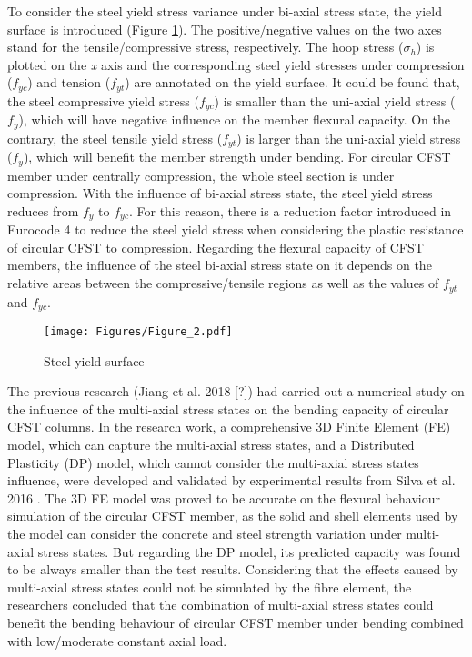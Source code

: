 \documentclass[12pt,a4]{article}
\begin{document}
	To consider the steel yield stress variance under bi-axial stress state, the yield surface is introduced (Figure \ref{fig-2}). The positive/negative values on the two axes stand for the tensile/compressive stress, respectively. The hoop stress ($\sigma_h$) is plotted on the \textit{x} axis and the corresponding steel yield stresses under compression ($f_{yc}$) and tension ($f_{yt}$) are annotated on the yield surface. It could be found that, the steel compressive yield stress ($f_{yc}$) is smaller than the uni-axial yield stress ($f_y$), which will have negative influence on the member flexural capacity. On the contrary, the steel tensile yield stress ($f_{yt}$) is larger than the uni-axial yield stress ($f_y$), which will benefit the member strength under bending. For circular CFST member under centrally compression, the whole steel section is under compression. With the influence of bi-axial stress state, the steel yield stress reduces from $f_y$ to $f_{yc}$. For this reason, there is a reduction factor introduced in Eurocode 4 \cite{RN64} to reduce the steel yield stress when considering the plastic resistance of circular CFST to compression. Regarding the flexural capacity of CFST members, the influence of the steel bi-axial stress state on it depends on the relative areas between the compressive/tensile regions as well as the values of $f_{yt}$ and $f_{yc}$.
	\par
	\begin{figure}[h]
		\centering
		\texttt{[image: Figures/Figure\_2.pdf]}
		\caption{Steel yield surface}
		\label{fig-2}
	\end{figure}
	\par
	The previous research (Jiang et al. 2018 [?]) had carried out a numerical study on the influence of the multi-axial stress states on the bending capacity of circular CFST columns. In the research work, a comprehensive 3D Finite Element (FE) model, which can capture the multi-axial stress states, and a Distributed Plasticity (DP) model, which cannot consider the multi-axial stress states influence, were developed and validated by experimental results from Silva et al. 2016 \cite{Silva2016}. The 3D FE model was proved to be accurate on the flexural behaviour simulation of the circular CFST member, as the solid and shell elements used by the model can consider the concrete and steel strength variation under multi-axial stress states. But regarding the DP model, its predicted capacity was found to be always smaller than the test results. Considering that the effects caused by multi-axial stress states could not be simulated by the fibre element, the researchers concluded that the combination of multi-axial stress states could benefit the bending behaviour of circular CFST member under bending combined with low/moderate constant axial load.
\end{document}
